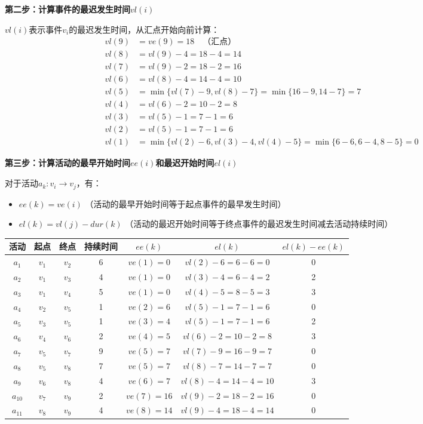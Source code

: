 \documentclass[12pt,a4paper]{amsart}
\begin{document}
\textbf{第二步：计算事件的最迟发生时间$vl(i)$}

$vl(i)$表示事件$v_i$的最迟发生时间，从汇点开始向前计算：
\begin{align}
vl(9) &= ve(9) = 18 \quad \text{（汇点）}\\
vl(8) &= vl(9) - 4 = 18 - 4 = 14\\
vl(7) &= vl(9) - 2 = 18 - 2 = 16\\
vl(6) &= vl(8) - 4 = 14 - 4 = 10\\
vl(5) &= \min\{vl(7) - 9, vl(8) - 7\} = \min\{16-9, 14-7\} = 7\\
vl(4) &= vl(6) - 2 = 10 - 2 = 8\\
vl(3) &= vl(5) - 1 = 7 - 1 = 6\\
vl(2) &= vl(5) - 1 = 7 - 1 = 6\\
vl(1) &= \min\{vl(2) - 6, vl(3) - 4, vl(4) - 5\} = \min\{6-6, 6-4, 8-5\} = 0
\end{align}

\textbf{第三步：计算活动的最早开始时间$ee(i)$和最迟开始时间$el(i)$}

对于活动$a_k: v_i \rightarrow v_j$，有：
\begin{itemize}
    \item $ee(k) = ve(i)$ （活动的最早开始时间等于起点事件的最早发生时间）
    \item $el(k) = vl(j) - dur(k)$ （活动的最迟开始时间等于终点事件的最迟发生时间减去活动持续时间）
\end{itemize}

\begin{center}
\begin{tabular}{|c|c|c|c|c|c|c|}
\hline
活动 & 起点 & 终点 & 持续时间 & $ee(k)$ & $el(k)$ & $el(k)-ee(k)$ \\
\hline
$a_1$ & $v_1$ & $v_2$ & 6 & $ve(1)=0$ & $vl(2)-6=6-6=0$ & 0 \\
\hline
$a_2$ & $v_1$ & $v_3$ & 4 & $ve(1)=0$ & $vl(3)-4=6-4=2$ & 2 \\
\hline
$a_3$ & $v_1$ & $v_4$ & 5 & $ve(1)=0$ & $vl(4)-5=8-5=3$ & 3 \\
\hline
$a_4$ & $v_2$ & $v_5$ & 1 & $ve(2)=6$ & $vl(5)-1=7-1=6$ & 0 \\
\hline
$a_5$ & $v_3$ & $v_5$ & 1 & $ve(3)=4$ & $vl(5)-1=7-1=6$ & 2 \\
\hline
$a_6$ & $v_4$ & $v_6$ & 2 & $ve(4)=5$ & $vl(6)-2=10-2=8$ & 3 \\
\hline
$a_7$ & $v_5$ & $v_7$ & 9 & $ve(5)=7$ & $vl(7)-9=16-9=7$ & 0 \\
\hline
$a_8$ & $v_5$ & $v_8$ & 7 & $ve(5)=7$ & $vl(8)-7=14-7=7$ & 0 \\
\hline
$a_9$ & $v_6$ & $v_8$ & 4 & $ve(6)=7$ & $vl(8)-4=14-4=10$ & 3 \\
\hline
$a_{10}$ & $v_7$ & $v_9$ & 2 & $ve(7)=16$ & $vl(9)-2=18-2=16$ & 0 \\
\hline
$a_{11}$ & $v_8$ & $v_9$ & 4 & $ve(8)=14$ & $vl(9)-4=18-4=14$ & 0 \\
\hline
\end{tabular}
\end{center}
\end{document}
